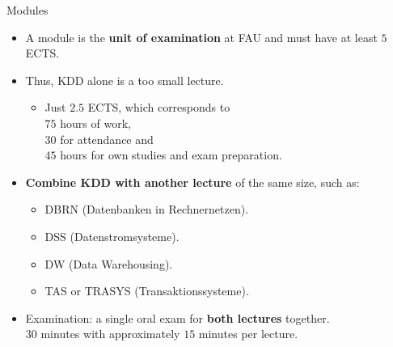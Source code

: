 \documentclass[aspectratio=169,t]{beamer}
\begin{document}
  { %
    \begin{frame}{Modules}
      \begin{itemize}
          \item A module is the \textbf{unit of examination} at FAU and must have at least $5$ ECTS.
          \item Thus, KDD alone is a too small lecture.
                \begin{itemize}
                    \item Just $2.5$ ECTS, which corresponds to \\
                          $75$ hours of work, \\
                          $30$ for attendance and \\
                          $45$ hours for own studies and exam preparation.
                \end{itemize}
          \item \textbf{Combine KDD with another lecture} of the same size, such as:
                \begin{itemize}
                    \item DBRN (Datenbanken in Rechnernetzen).
                    \item DSS (Datenstromsysteme).
                    \item DW (Data Warehousing).
                    \item TAS or TRASYS (Transaktionssysteme).
                \end{itemize}
          \item Examination: a single oral exam for \textbf{both lectures} together.\\
                $30$ minutes with approximately $15$ minutes per lecture.
      \end{itemize}
    \end{frame}
  }
\end{document}
